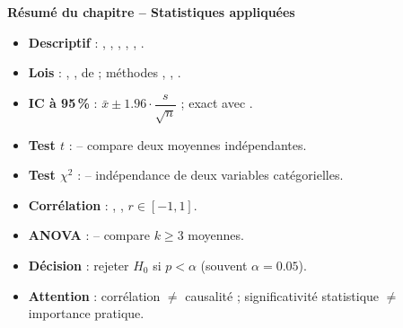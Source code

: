 \begin{formules}
\textbf{R\'esum\'e du chapitre -- Statistiques appliqu\'ees}
\begin{itemize}
    \item \textbf{Descriptif} : , , , , , .
    \item \textbf{Lois} : , ,  de  ; m\'ethodes , , .
    \item \textbf{IC \`a 95\,\%} : $\bar{x} \pm 1.96 \cdot \dfrac{s}{\sqrt{n}}$ ; exact avec .
    \item \textbf{Test $t$} :  -- compare deux moyennes ind\'ependantes.
    \item \textbf{Test $\chi^2$} :  -- ind\'ependance de deux variables cat\'egorielles.
    \item \textbf{Corr\'elation} : , , $r \in [-1, 1]$.
    \item \textbf{ANOVA} :  -- compare $k \geq 3$ moyennes.
    \item \textbf{D\'ecision} : rejeter $H_0$ si $p < \alpha$ (souvent $\alpha = 0.05$).
    \item \textbf{Attention} : corr\'elation $\neq$ causalit\'e ; significativit\'e statistique $\neq$ importance pratique.
\end{itemize}
\end{formules}
